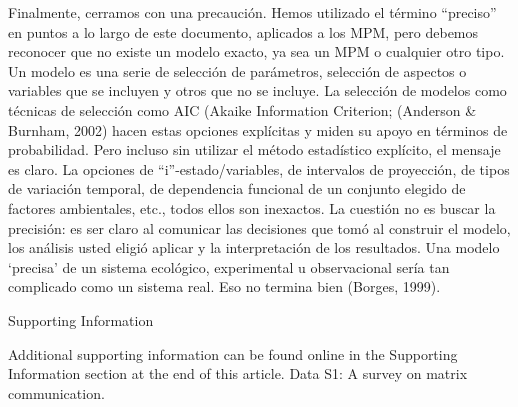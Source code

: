 \documentclass[
  12pt,
  letterpaper,
]{book}
\begin{document}
Finalmente, cerramos con una precaución. Hemos utilizado el término
``preciso'' en puntos a lo largo de este documento, aplicados a los MPM,
pero debemos reconocer que no existe un modelo exacto, ya sea un MPM o
cualquier otro tipo. Un modelo es una serie de selección de parámetros,
selección de aspectos o variables que se incluyen y otros que no se
incluye. La selección de modelos como técnicas de selección como AIC
(Akaike Information Criterion; (Anderson \& Burnham, 2002) hacen estas
opciones explícitas y miden su apoyo en términos de probabilidad. Pero
incluso sin utilizar el método estadístico explícito, el mensaje es
claro. La opciones de ``i''-estado/variables, de intervalos de
proyección, de tipos de variación temporal, de dependencia funcional de
un conjunto elegido de factores ambientales, etc., todos ellos son
inexactos. La cuestión no es buscar la precisión: es ser claro al
comunicar las decisiones que tomó al construir el modelo, los análisis
usted eligió aplicar y la interpretación de los resultados. Una modelo
`precisa' de un sistema ecológico, experimental u observacional sería
tan complicado como un sistema real. Eso no termina bien (Borges, 1999).

Supporting Information

Additional supporting information can be found online in the Supporting
Information section at the end of this article. Data S1: A survey on
matrix communication.
\end{document}
